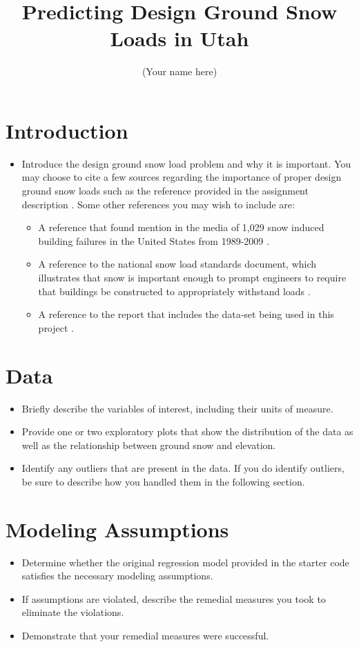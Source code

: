 \documentclass[11pt]{article}
\title{Predicting Design Ground Snow Loads in Utah}
\author{(Your name here)}
\begin{document}
\maketitle



\section{Introduction}

\begin{itemize}
\item Introduce the design ground snow load problem and why it is important. You may choose to cite a few sources regarding the importance of proper design ground snow loads such as the reference provided in the assignment description \citep{Arcement2017}. Some other references you may wish to include are:
\begin{itemize}
\item A reference that found mention in the media of 1,029 snow induced building failures in the United States from 1989-2009 \citep{Geis2011}.
\item A reference to the national snow load standards document, which illustrates that snow is important enough to prompt engineers to require that buildings be constructed to appropriately withstand loads \citep{ASCE2017}.
\item A reference to the report that includes the data-set being used in this project \citep{Bean2018-report}.
\end{itemize}
\end{itemize}

\section{Data}
\begin{itemize}
\item Briefly describe the variables of interest, including their units of measure. 
\item Provide one or two exploratory plots that show the distribution of the data as well as the relationship between ground snow and elevation. 
\item Identify any outliers that are present in the data. If you do identify outliers, be sure to describe how you handled them in the following section. 
\end{itemize}

\section{Modeling Assumptions}
\begin{itemize}
\item Determine whether the original regression model provided in the starter code satisfies the necessary modeling assumptions. 
\item If assumptions are violated, describe the remedial measures you took to eliminate the violations. 
\item Demonstrate that your remedial measures were successful. 
\end{itemize}
\end{document}
